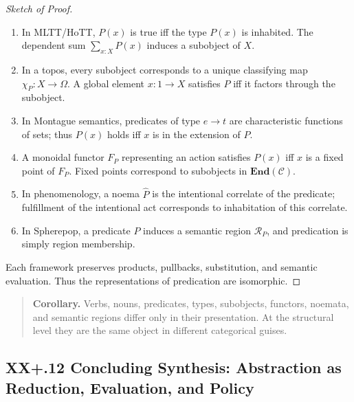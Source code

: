 \documentclass[12pt,letterpaper]{article}
\begin{document}
\begin{proof}[Sketch of Proof]
\begin{enumerate}
    \item In MLTT/HoTT, $P(x)$ is true iff the type $P(x)$ is inhabited.  
    The dependent sum $\sum_{x:X}P(x)$ induces a subobject of $X$.

    \item In a topos, every subobject corresponds to a unique classifying map
    $\chi_P : X \to \Omega$.  A global element $x : 1 \to X$ satisfies $P$ iff it
    factors through the subobject.

    \item In Montague semantics, predicates of type $e \to t$ are characteristic
    functions of sets; thus $P(x)$ holds iff $x$ is in the extension of $P$.

    \item A monoidal functor $F_P$ representing an action satisfies $P(x)$ iff
    $x$ is a fixed point of $F_P$.  Fixed points correspond to subobjects in
    $\mathbf{End}(\mathcal{C})$.

    \item In phenomenology, a noema $\widehat{P}$ is the intentional correlate of
    the predicate; fulfillment of the intentional act corresponds to inhabitation
    of this correlate.

    \item In Spherepop, a predicate $P$ induces a semantic region
    $\mathcal{R}_P$, and predication is simply region membership.

\end{enumerate}

Each framework preserves products, pullbacks, substitution, and semantic
evaluation.  Thus the representations of predication are isomorphic.
\end{proof}

\begin{quote}
\textbf{Corollary.}  
Verbs, nouns, predicates, types, subobjects, functors, noemata, and semantic
regions differ only in their presentation.  At the structural level they are the
same object in different categorical guises.
\end{quote}

\subsection{XX+.12 Concluding Synthesis: Abstraction as Reduction, Evaluation, and Policy}
\end{document}
